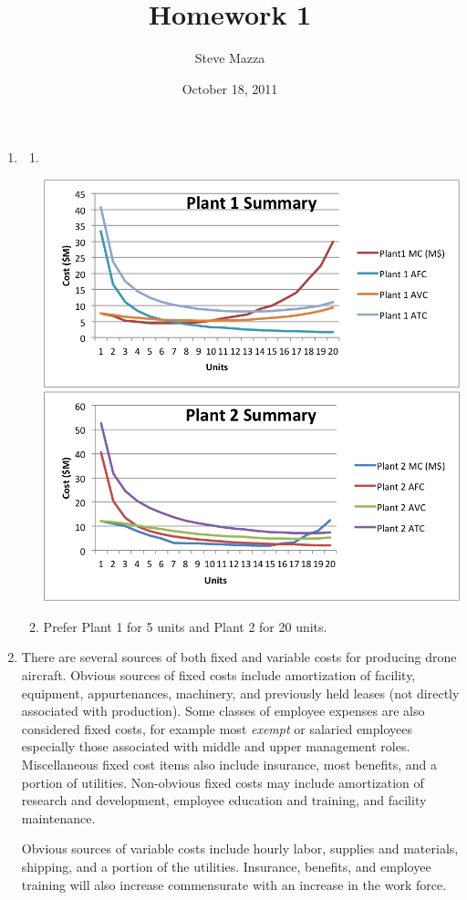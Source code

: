 \documentclass[letterpaper,10pt]{article}
\title{Homework 1}
\author{Steve Mazza}
\date{October 18, 2011}
\begin{document}
\maketitle

\begin{enumerate}
\item
\begin{enumerate}
\item\ \\
\begin{center}
\includegraphics[scale=0.75]{Plant1Plot.png} \\
\includegraphics[scale=0.75]{Plant2Plot.png}
\end{center}
\item Prefer Plant 1 for 5 units and Plant 2 for 20 units.
\end{enumerate}

\item There are several sources of both fixed and variable costs for producing drone aircraft.  Obvious sources of fixed costs include amortization of facility, equipment, appurtenances, machinery, and previously held leases (not directly associated with production).  Some classes of employee expenses are also considered fixed costs, for example most \emph{exempt} or salaried employees especially those associated with middle and upper management roles.  Miscellaneous fixed cost items also include insurance, most benefits, and a portion of utilities.  Non-obvious fixed costs may include amortization of research and development, employee education and training, and facility maintenance.
\par Obvious sources of variable costs include hourly labor, supplies and materials, shipping, and a portion of the utilities.  Insurance, benefits, and employee training will also increase commensurate with an increase in the work force.


\end{enumerate}
\end{document}
